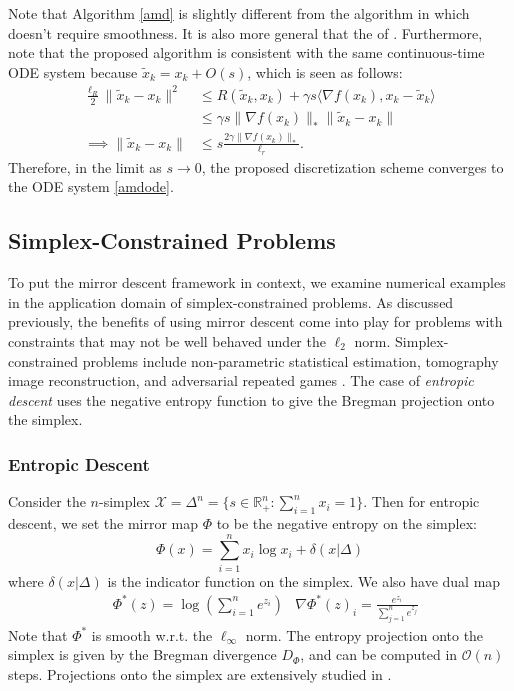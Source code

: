 Note that Algorithm \ref{amd} is slightly different from the algorithm in \citet{nesterov2005smooth} which doesn't require smoothness. It is also more general that the of \citet{allen2014linear}. Furthermore, note that the proposed algorithm is consistent with the same continuous-time ODE system because $\tilde x_k = x_k + O(s)$, which is seen as follows:
\begin{align*}
\frac{\ell_R}{2} \| \tilde x_k - x_k \|^2 &\leq R(\tilde x_k, x_k) + \gamma s \langle \nabla f(x_k), x_k - \tilde x_k \rangle\\
&\leq \gamma s \|\nabla f(x_k) \|_* \|\tilde x_k - x_k \|\\
\implies \| \tilde x_k - x_k \| &\leq s\frac{2\gamma\|\nabla f(x_k) \|_*}{\ell_r}.
\end{align*}
Therefore, in the limit as $s\to0$, the proposed discretization scheme converges to the ODE system \eqref{amdode}.



\subsection{Simplex-Constrained Problems}
To put the mirror descent framework in context, we examine numerical examples in the application domain of simplex-constrained problems. As discussed previously, the benefits of using mirror descent come into play for problems with constraints that may not be well behaved under the $\ell_2$ norm. Simplex-constrained problems include non-parametric statistical estimation, tomography image reconstruction, and adversarial repeated games \citep{krichene2015efficient}. The case of \textit{entropic descent} uses the negative entropy function to give the Bregman projection onto the simplex.

\subsubsection{Entropic Descent}

Consider the $n$-simplex $\mathcal{X} = \Delta^n = \{s\in \mathbb{R}^n_+ : \sum_{i=1}^n x_i = 1\}$. Then for entropic descent, we set the mirror map $\Phi$ to be the negative entropy on the simplex:
\[\Phi(x) = \sum_{i=1}^n x_i \log x_i + \delta(x|\Delta)\]
where $\delta(x|\Delta)$ is the indicator function on the simplex. We also have dual map
\begin{align*}
&\Phi^*(z) = \log \left( \sum_{i=1}^n e^{z_i} \right) &\nabla \Phi^*(z)_i = \frac{e^{z_i}}{ \sum_{j=1}^n e^{z_j}}
\end{align*}
Note that $\Phi^*$ is smooth w.r.t. the $\ell_\infty$ norm. The entropy projection onto the simplex is given by the Bregman divergence $D_\Phi$, and can be computed in $\mathcal{O}(n)$ steps. Projections onto the simplex are extensively studied in \citet{krichene2015efficient}.

